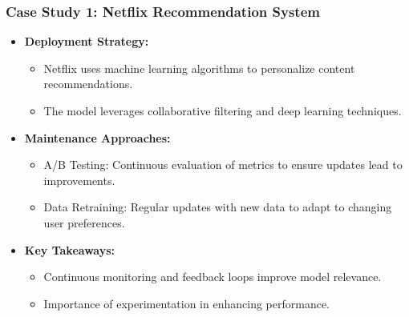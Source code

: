 \documentclass[aspectratio=169]{beamer}
\begin{document}
\begin{frame}[fragile]
    \frametitle{Case Study 1: Netflix Recommendation System}
    \begin{itemize}
        \item \textbf{Deployment Strategy:}
            \begin{itemize}
                \item Netflix uses machine learning algorithms to personalize content recommendations.
                \item The model leverages collaborative filtering and deep learning techniques.
            \end{itemize}
        \item \textbf{Maintenance Approaches:}
            \begin{itemize}
                \item A/B Testing: Continuous evaluation of metrics to ensure updates lead to improvements.
                \item Data Retraining: Regular updates with new data to adapt to changing user preferences.
            \end{itemize}
        \item \textbf{Key Takeaways:}
            \begin{itemize}
                \item Continuous monitoring and feedback loops improve model relevance.
                \item Importance of experimentation in enhancing performance.
            \end{itemize}
    \end{itemize}
\end{frame}
\end{document}
